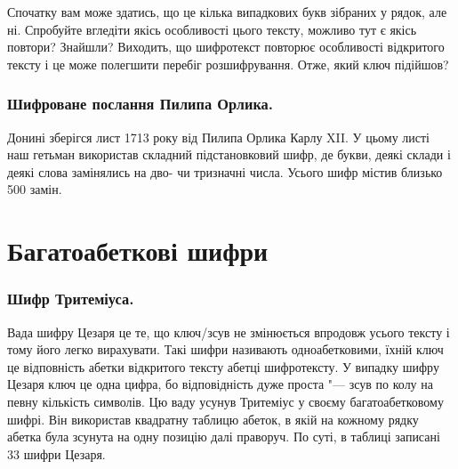 \documentclass{book}
\begin{document}
Спочатку вам може здатись, що це кілька випадкових букв зібраних у рядок, але ні.
Спробуйте вгледіти якісь особливості цього тексту, можливо тут є якісь повтори?
Знайшли? Виходить, що шифротекст повторює особливості відкритого тексту і це може
полегшити перебіг розшифрування. Отже, який ключ підійшов?

\subsection*{Шифроване послання Пилипа Орлика.}
Донині зберігся лист 1713 року від Пилипа Орлика Карлу XII. У цьому листі наш
гетьман використав складний підстановковий шифр, де букви, деякі склади і деякі
слова замінялись на дво- чи тризначні числа. Усього шифр містив близько 500 замін.


\chapter*{Багатоабеткові шифри}

\subsection*{Шифр Тритеміуса.}

Вада шифру Цезаря це те, що ключ/зсув не змінюється впродовж усього тексту і
тому його легко вирахувати. Такі шифри називають одноабетковими, їхній ключ це
відповність абетки відкритого тексту абетці шифротексту. У випадку шифру Цезаря
ключ це одна цифра, бо відповідність дуже проста "--- зсув по колу на певну
кількість символів. Цю ваду усунув Тритеміус у своєму багатоабетковому шифрі.
Він використав квадратну таблицю абеток, в якій на кожному рядку абетка була
зсунута на одну позицію далі праворуч. По суті, в таблиці записані 33 шифри
Цезаря.
\end{document}
